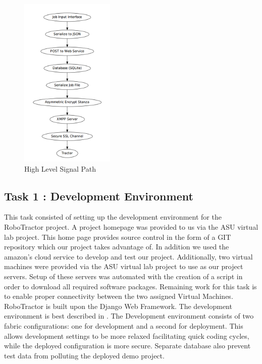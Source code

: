 \documentclass[conference,12pt]{IEEEtran}
\begin{document}
\begin{figure}
\centering
\includegraphics[width=0.4\textwidth]{Images/signalpath.png}
\caption{High Level Signal Path}
\label{fig:signalpath}
\end{figure}

\subsection{Task 1 : Development Environment}
This task consisted of setting up the development environment for the
RoboTractor project. A project homepage was provided to us via the ASU virtual
lab project. This home page provides source control in the form of a GIT
repository which our project takes advantage of. In addition we used the amazon's cloud service to develop and test our project. Additionally, two virtual machines were provided via the ASU virtual lab project to use as our project servers. Setup of these servers was automated with the creation of a script in order to download all required software packages. Remaining work for this task is to enable proper connectivity between the two assigned Virtual Machines.
RoboTractor is built upon the Django Web Framework. The development environment is best
described in \autocite{_django_2014}. The Development environment consists of
two fabric configurations: one for development and a second for deployment. This
allows development settings to be more relaxed facilitating quick coding
cycles, while the deployed configuration is more secure. Separate database
also prevent test data from polluting the deployed demo project.
\end{document}
